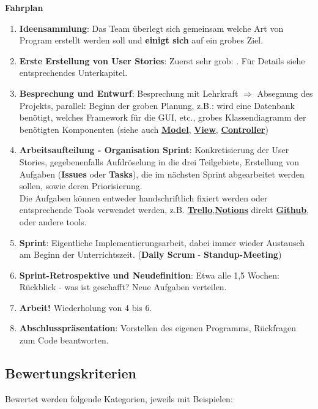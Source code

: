 \documentclass{article}
\begin{document}
\textbf{Fahrplan}

\begin{enumerate}
    \item \textbf{Ideensammlung}: Das Team überlegt sich gemeinsam welche Art von Program erstellt werden soll und \textbf{einigt sich} auf ein grobes Ziel.
    \item \textbf{Erste Erstellung von User Stories}: Zuerst sehr grob: . Für Details siehe entsprechendes  Unterkapitel.
    \item \textbf{Besprechung und Entwurf}: Besprechung mit Lehrkraft $\Rightarrow$ Absegnung des Projekts, parallel: Beginn der groben Planung, z.B.: wird eine Datenbank benötigt, welches Framework für die GUI, etc., grobes Klassendiagramm der benötigten Komponenten (siehe auch \hyperref[sec:hwModel]{\textbf{Model}}, \hyperref[sec:hwView]{\textbf{View}}, \hyperref[sec:hwController]{\textbf{Controller}})
    \item \textbf{Arbeitsaufteilung - Organisation Sprint}: Konkretisierung der User Stories, gegebenenfalls Aufdröselung in die drei Teilgebiete, Erstellung von Aufgaben (\textbf{Issues} oder \textbf{Tasks}), die im nächsten Sprint abgearbeitet werden sollen, sowie deren Priorisierung. \\
    Die Aufgaben können entweder handschriftlich fixiert werden oder entsprechende Tools verwendet werden, z.B. \textbf{\href{https://trello.com/}{Trello}},\textbf{\href{https://www.notion.so/de-de}{Notions}} direkt \hyperref[sec:git]{\textbf{Github}}, oder andere tools.
    \item \textbf{Sprint}: Eigentliche Implementierungsarbeit, dabei immer wieder Austausch am Beginn der Unterrichtszeit. (\textbf{Daily Scrum} - \textbf{Standup-Meeting})
    \item \textbf{Sprint-Retrospektive und Neudefinition}: Etwa alle 1,5 Wochen: Rückblick - was ist geschafft? Neue Aufgaben verteilen. 
    \item \textbf{Arbeit!} Wiederholung von 4 bis 6. 
    \item \textbf{Abschlusspräsentation}: Vorstellen des eigenen Programms, Rückfragen zum Code beantworten. 
\end{enumerate}


\subsection{Bewertungskriterien}
\label{sec:Bewertung}
Bewertet werden folgende Kategorien, jeweils mit Beispielen:
\end{document}
